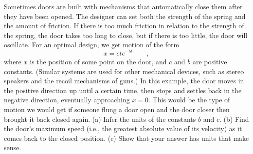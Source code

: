 Sometimes doors are built with mechanisms that automatically close them after
they have been opened. The designer can set both the strength of the spring
and the amount of friction. If there is too much friction in relation to the strength of the spring, the door takes
too long to close, but if there is too little, the door will oscillate.
For an optimal design, we get motion of the form
\begin{equation*}
 x=ct e^{-bt} \qquad ,
\end{equation*}
 where $x$ is the position of some point on the door,
and $c$ and $b$ are positive constants. (Similar systems are used for other mechanical devices, such as stereo
speakers and the recoil mechanisms of guns.) In this example, the door moves in the positive direction up until
a certain time, then stops and settles back in the negative direction, eventually approaching $x=0$. This would be
the type of motion we would get if someone flung a door open and the door closer then brought it back closed again.
(a) Infer the units of the constants $b$ and $c$.\hwendpart
(b) Find the door's maximum speed (i.e., the greatest absolute value of its velocity) as it 
comes back to the closed position.\answercheck\hwendpart
(c) Show that your answer has units that make sense.
